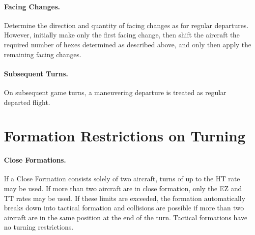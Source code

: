 \begin{advancedrules}
\paragraph{Facing Changes.} Determine the direction and quantity of facing changes as for regular departures. However, initially make only the first facing change, then shift the aircraft the required number of hexes determined as described above, and only then apply the remaining facing changes.


\paragraph{Subsequent Turns.} On subsequent game turns, a maneuvering departure is treated as regular departed flight.

\section{Formation Restrictions on Turning}

\paragraph{Close Formations.} If a Close Formation consists solely of two aircraft, turns of up to the HT rate may be used. If more than two aircraft are in close formation, only the EZ and TT rates may be used. If these limits are exceeded, the formation automatically breaks down into tactical formation and collisions are possible if more than two aircraft are in the same position at the end of the turn. Tactical formations have no turning restrictions.

\end{advancedrules}

